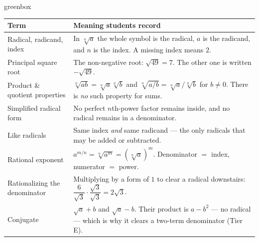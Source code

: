 \documentclass[10pt]{article}
\begin{document}
\begin{skillbox}{greenbox}
\renewcommand{\arraystretch}{1.35}
\begin{tabularx}{\linewidth}{@{}p{3.6cm}X@{}}
\textbf{Term} & \textbf{Meaning students record} \\
\hline
Radical, radicand, index & In $\sqrt[n]{a}$ the whole symbol is the radical, $a$ is the radicand,
    and $n$ is the index. A missing index means $2$. \\
Principal square root & The non-negative root: $\sqrt{49}=7$. The other one is written
    $-\sqrt{49}$. \\
Product \& quotient properties & $\sqrt[n]{ab}=\sqrt[n]{a}\sqrt[n]{b}$ and
    $\sqrt[n]{a/b}=\sqrt[n]{a}/\sqrt[n]{b}$ for $b \ne 0$. There is \emph{no} such property for
    sums. \\
Simplified radical form & No perfect $n$th-power factor remains inside, and no radical remains in
    a denominator. \\
Like radicals & Same index \emph{and} same radicand --- the only radicals that may be added or
    subtracted. \\
Rational exponent & $a^{m/n}=\sqrt[n]{a^m}=\left(\sqrt[n]{a}\right)^m$. Denominator $=$ index,
    numerator $=$ power. \\
Rationalizing the denominator & Multiplying by a form of $1$ to clear a radical downstairs:
    $\dfrac{6}{\sqrt3}\cdot\dfrac{\sqrt3}{\sqrt3}=2\sqrt3$. \\
Conjugate & $\sqrt a + b$ and $\sqrt a - b$. Their product is $a-b^2$ --- no radical --- which is
    why it clears a two-term denominator (Tier E). \\
\end{tabularx}
\end{skillbox}
\end{document}
